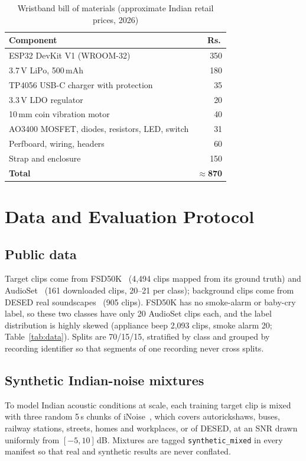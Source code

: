 \documentclass[conference]{IEEEtran}
\newcommand{\INR}{Rs.\,}
\begin{document}
\begin{table}[t]
\caption{Wristband bill of materials (approximate Indian retail prices, 2026)}
\label{tab:bom}
\centering\footnotesize
\begin{tabular}{@{}lr@{}}
\toprule
Component & \INR \\
\midrule
ESP32 DevKit V1 (WROOM-32) & 350 \\
3.7\,V LiPo, 500\,mAh & 180 \\
TP4056 USB-C charger with protection & 35 \\
3.3\,V LDO regulator & 20 \\
10\,mm coin vibration motor & 40 \\
AO3400 MOSFET, diodes, resistors, LED, switch & 31 \\
Perfboard, wiring, headers & 60 \\
Strap and enclosure & 150 \\
\midrule
\textbf{Total} & \textbf{$\approx$870} \\
\bottomrule
\end{tabular}
\end{table}

\section{Data and Evaluation Protocol}\label{sec:data}
\subsection{Public data}
Target clips come from FSD50K~\cite{fonseca2022} (4,494 clips mapped from its ground truth) and AudioSet~\cite{gemmeke2017} (161 downloaded clips, 20--21 per class); background clips come from DESED real soundscapes~\cite{turpault2019} (905 clips). FSD50K has no smoke-alarm or baby-cry label, so these two classes have only 20 AudioSet clips each, and the label distribution is highly skewed (appliance beep 2,093 clips, smoke alarm 20; Table~\ref{tab:data}). Splits are 70/15/15, stratified by class and grouped by recording identifier so that segments of one recording never cross splits.

\subsection{Synthetic Indian-noise mixtures}
To model Indian acoustic conditions at scale, each training target clip is mixed with three random 5\,s chunks of iNoise~\cite{inoise}, which covers autorickshaws, buses, railway stations, streets, homes and workplaces, or of DESED, at an SNR drawn uniformly from $[-5, 10]$\,dB. Mixtures are tagged \texttt{synthetic\_mixed} in every manifest so that real and synthetic results are never conflated.
\end{document}
